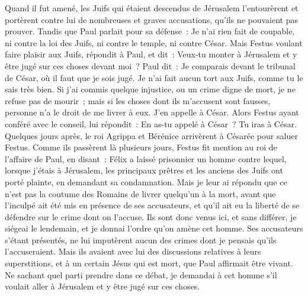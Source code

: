 \begin{multicols}{2}
Quand il fut amené, les Juifs qui étaient descendus de Jérusalem l'entourèrent et portèrent contre lui de nombreuses et graves accusations, qu'ils ne pouvaient pas prouver.
Tandis que Paul parlait pour sa défense~: Je n'ai rien fait de coupable, ni contre la loi des Juifs, ni contre le temple, ni contre César.
Mais Festus voulant faire plaisir aux Juifs, répondit à Paul, et dit~: Veux-tu monter à Jérusalem et y être jugé sur ces choses devant moi~?
Paul dit~: Je comparais devant le tribunal de César, où il faut que je sois jugé. Je n'ai fait aucun tort aux Juifs, comme tu le sais très bien.
Si j'ai commis quelque injustice, ou un crime digne de mort, je ne refuse pas de mourir~; mais si les choses dont ils m'accusent sont fausses, personne n'a le droit de me livrer à eux. J'en appelle à César.
Alors Festus ayant conféré avec le conseil, lui répondit~: En as-tu appelé à César~? Tu iras à César.
Quelques jours après, le roi Agrippa et Bérénice arrivèrent à Césarée pour saluer Festus.
Comme ils passèrent là plusieurs jours, Festus fit mention au roi de l'affaire de Paul, en disant~: Félix a laissé prisonnier un homme
contre lequel, lorsque j'étais à Jérusalem, les principaux prêtres et les anciens des Juifs ont porté plainte, en demandant sa condamnation.
Mais je leur ai répondu que ce n'est pas la coutume des Romains de livrer quelqu'un à la mort, avant que l'inculpé ait été mis en présence de ses accusateurs, et qu'il ait eu la liberté de se défendre sur le crime dont on l'accuse.
Ils sont donc venus ici, et sans différer, je siégeai le lendemain, et je donnai l'ordre qu'on amène cet homme.
Ses accusateurs s'étant présentés, ne lui imputèrent aucun des crimes dont je pensais qu'ils l'accuseraient.
Mais ils avaient avec lui des discussions relatives à leurs superstitions, et à un certain Jésus qui est mort, que Paul affirmait être vivant.
Ne sachant quel parti prendre dans ce débat, je demandai à cet homme s'il voulait aller à Jérusalem et y être jugé sur ces choses.

\end{multicols}
